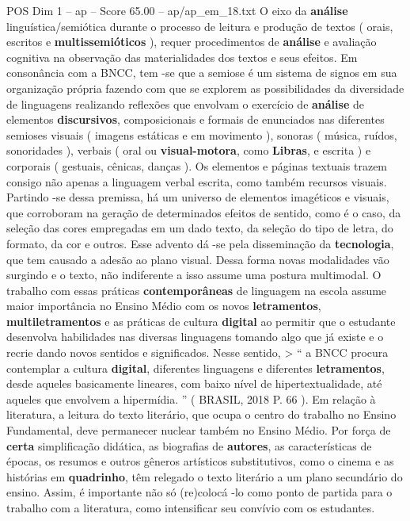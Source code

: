\begin{textsample}{POS Dim 1 – ap – Score 65.00 – ap/ap\_em\_18.txt}
O eixo da \textbf{análise} linguística/semiótica durante o processo de leitura e produção de textos ( orais, escritos e \textbf{multissemióticos} ), requer procedimentos de \textbf{análise} e avaliação cognitiva na observação das materialidades dos textos e seus efeitos.
Em consonância com a BNCC, tem -se que a semiose é um sistema de signos em sua organização própria fazendo com que se explorem as possibilidades da diversidade de linguagens realizando reflexões que envolvam o exercício de \textbf{análise} de elementos \textbf{discursivos}, composicionais e formais de enunciados nas diferentes semioses visuais ( imagens estáticas e em movimento ), sonoras ( música, ruídos, sonoridades ), verbais ( oral ou \textbf{visual-motora}, como \textbf{Libras}, e escrita ) e corporais ( gestuais, cênicas, danças ).
Os elementos e páginas textuais trazem consigo não apenas a linguagem verbal escrita, como também recursos visuais.
Partindo -se dessa premissa, há um universo de elementos imagéticos e visuais, que corroboram na geração de determinados efeitos de sentido, como é o caso, da seleção das cores empregadas em um dado texto, da seleção do tipo de letra, do formato, da cor e outros.
Esse advento dá -se pela disseminação da \textbf{tecnologia}, que tem causado a adesão ao plano visual.
Dessa forma novas modalidades vão surgindo e o texto, não indiferente a isso assume uma postura multimodal.
O trabalho com essas práticas \textbf{contemporâneas} de linguagem na escola assume maior importância no Ensino Médio com os novos \textbf{letramentos}, \textbf{multiletramentos} e as práticas de cultura \textbf{digital} ao permitir que o estudante desenvolva habilidades nas diversas linguagens tomando algo que já existe e o recrie dando novos sentidos e significados.
Nesse sentido, > “ a BNCC procura contemplar a cultura \textbf{digital}, diferentes linguagens e diferentes \textbf{letramentos}, desde aqueles basicamente lineares, com baixo nível de hipertextualidade, até aqueles que envolvem a hipermídia. ” ( BRASIL, 2018 P. 66 ).
Em relação à literatura, a leitura do texto literário, que ocupa o centro do trabalho no Ensino Fundamental, deve permanecer nuclear também no Ensino Médio.
Por força de \textbf{certa} simplificação didática, as biografias de \textbf{autores}, as características de épocas, os resumos e outros gêneros artísticos substitutivos, como o cinema e as histórias em \textbf{quadrinho}, têm relegado o texto literário a um plano secundário do ensino.
Assim, é importante não só (re)colocá -lo como ponto de partida para o trabalho com a literatura, como intensificar seu convívio com os estudantes.

\end{textsample}
